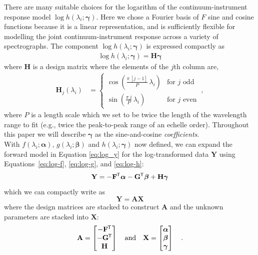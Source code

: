 \documentclass[modern,linenumbers]{aastex631}
\renewcommand{\vec}[1]{\mathbf{#1}}
\newcommand{\vecalpha}{\boldsymbol{\alpha}}
\newcommand{\vecbeta}{\boldsymbol{\beta}}
\newcommand{\vecgamma}{\boldsymbol{\gamma}}
\newcommand*{\transpose}{^{\mkern-1.5mu\mathsf{T}}}
\renewcommand{\added}[1]{#1}
\newcommand{\removed}[1]{}
\begin{document}
There are many suitable choices for the logarithm of the continuum-instrument response model $\log{h(\lambda_i;\vecgamma)}$. Here we chose a Fourier basis of \added{$F$} sine and cosine functions because it is a linear representation, and is sufficiently flexible for modelling the joint continuum-instrument response across a variety of spectrographs. The component $\log{h(\lambda_i;\vecgamma)}$ is expressed compactly as
\begin{align}
    \log{h(\lambda_i;\vecgamma)} = \vec{H}\vecgamma \label{eq:log-h}
\end{align}
where $\vec{H}$ is a design matrix where the elements of the $j$th column are, %
\begin{align}
    \vec{H}_{j}(\lambda_i) & = \left\{\begin{array}{cl}\displaystyle\cos\left(\frac{\pi\,[j-1]}{P}\,\lambda_i\right) & \mbox{for $j$ odd} \\[3ex]
    \displaystyle\sin\left(\frac{\pi\,j}{P}\,\lambda_i\right) & \mbox{for $j$ even}\end{array}\right. ~,
\end{align}
\noindent{}where $P$ is a length scale which we set to be twice the length of the wavelength range to fit (e.g., twice the peak-to-peak range of an echelle order). %
Throughout this paper we will describe $\vecgamma$ as the sine-and-cosine \emph{coefficients}.\\

\noindent{}With $f(\lambda_i;\vecalpha)$, $g(\lambda_i;\vecbeta)$ and $h(\lambda_i;\vecgamma)$ now defined, we can expand the forward model in Equation \ref{eq:log_y} for the log-transformed data $\vec{Y}$ \added{using Equations~\ref{eq:log-f}, \ref{eq:log-g}, and \ref{eq:log-h}}:
\begin{equation}
    \vec{Y} = -\vec{F}\transpose\vecalpha - \vec{G}\transpose\vecbeta + \vec{H}\vecgamma
\end{equation}
\noindent{}which we can compactly write as
\begin{equation}
    \vec{Y} = \vec{A}\vec{X}
\end{equation}
where the \removed{parameters and design matrices are stacked to construct}
\added{design matrices are stacked to construct} $\vec{A}$ and \added{the unknown parameters are stacked into} $\vec{X}$:
\begin{eqnarray}
    \vec{A} = \begin{bmatrix}-\vec{F}\transpose\\-\vec{G}\transpose\\\vec{H}\end{bmatrix}
    \quad \mbox{and} \quad
    \vec{X} = \begin{bmatrix}\vecalpha\\\vecbeta\\\vecgamma\end{bmatrix} \quad .
\end{eqnarray}
\end{document}
